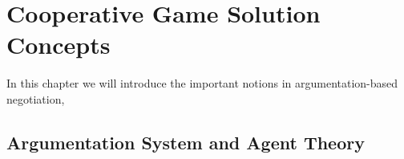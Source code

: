 \setcounter{chapter}{3}

\chapter{Cooperative Game Solution Concepts}

In this chapter we will introduce the important notions in argumentation-based negotiation,
\section{Argumentation System and Agent Theory}\label{sec:Argumentation}








